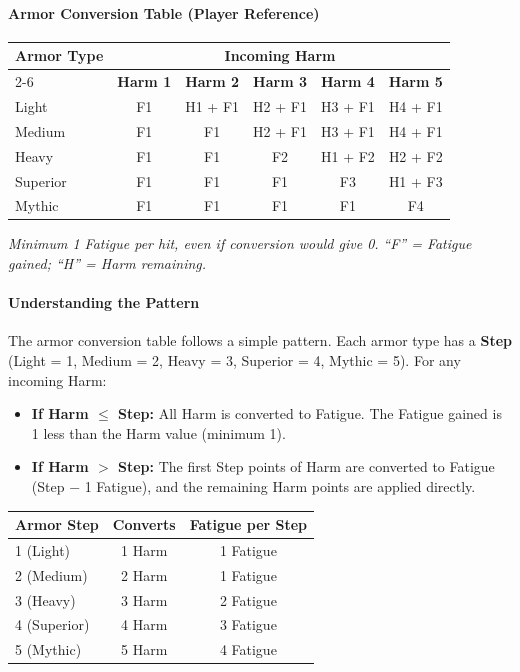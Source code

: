 \paragraph{Armor Conversion Table (Player Reference)}
\label{sec:armor}
\begin{center}
\begin{tabular}{l|ccccc}
\toprule
\textbf{Armor Type} & \multicolumn{5}{c}{\textbf{Incoming Harm}} \\
\cmidrule(lr){2-6}
& \textbf{Harm 1} & \textbf{Harm 2} & \textbf{Harm 3} & \textbf{Harm 4} & \textbf{Harm 5} \\
\midrule
Light  & F1 & H1 + F1 & H2 + F1 & H3 + F1 & H4 + F1 \\
Medium & F1 & F1 & H2 + F1 & H3 + F1 & H4 + F1 \\
Heavy  & F1 & F1 & F2 & H1 + F2 & H2 + F2 \\
Superior & F1 & F1 & F1 & F3 & H1 + F3 \\
Mythic   & F1 & F1 & F1 & F1 & F4 \\
\bottomrule
\end{tabular}
\end{center}
\textit{Minimum 1 Fatigue per hit, even if conversion would give 0.}
\textit{``F'' = Fatigue gained; ``H'' = Harm remaining.}

\paragraph{Understanding the Pattern}
The armor conversion table follows a simple pattern. Each armor type has a \textbf{Step} (Light = 1, Medium = 2, Heavy = 3, Superior = 4, Mythic = 5). For any incoming Harm:

\begin{itemize}
  \item \textbf{If Harm $\leq$ Step:} All Harm is converted to Fatigue. The Fatigue gained is 1 less than the Harm value (minimum 1).
  \item \textbf{If Harm $>$ Step:} The first Step points of Harm are converted to Fatigue (Step $-$ 1 Fatigue), and the remaining Harm points are applied directly.
\end{itemize}

\begin{center}
\begin{tabular}{l|c|c}
\toprule
\textbf{Armor Step} & \textbf{Converts} & \textbf{Fatigue per Step} \\
\midrule
1 (Light)  & 1 Harm & 1 Fatigue \\
2 (Medium) & 2 Harm & 1 Fatigue \\
3 (Heavy)  & 3 Harm & 2 Fatigue \\
4 (Superior) & 4 Harm & 3 Fatigue \\
5 (Mythic)   & 5 Harm & 4 Fatigue \\
\bottomrule
\end{tabular}
\end{center}

